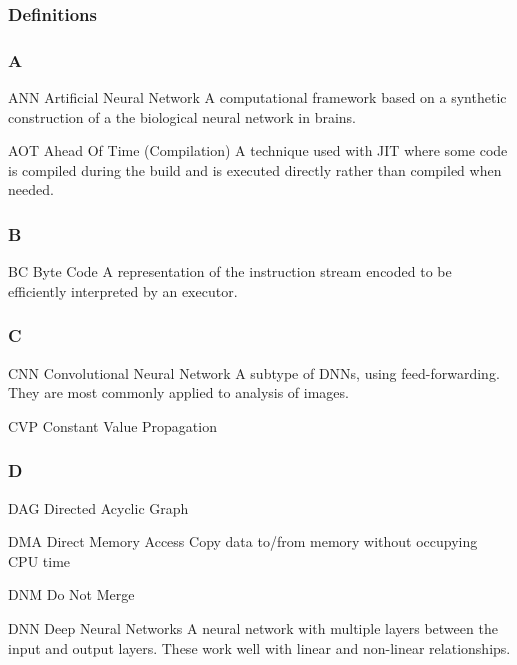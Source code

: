 \subsubsection*{Definitions}

\subsubsection*{A}


\begin{DoxyItemize}
\item A\+NN Artificial Neural Network A computational framework based on a synthetic construction of a the biological neural network in brains.
\item A\+OT Ahead Of Time (Compilation) A technique used with J\+IT where some code is compiled during the build and is executed directly rather than compiled when needed.
\end{DoxyItemize}

\subsubsection*{B}


\begin{DoxyItemize}
\item BC Byte Code A representation of the instruction stream encoded to be efficiently interpreted by an executor.
\end{DoxyItemize}

\subsubsection*{C}


\begin{DoxyItemize}
\item C\+NN Convolutional Neural Network A subtype of D\+N\+Ns, using feed-\/forwarding. They are most commonly applied to analysis of images.
\item C\+VP Constant Value Propagation
\end{DoxyItemize}

\subsubsection*{D}


\begin{DoxyItemize}
\item D\+AG Directed Acyclic Graph
\item D\+MA Direct Memory Access Copy data to/from memory without occupying C\+PU time
\item D\+NM Do Not Merge
\item D\+NN Deep Neural Networks A neural network with multiple layers between the input and output layers. These work well with linear and non-\/linear relationships.
\end{DoxyItemize}

